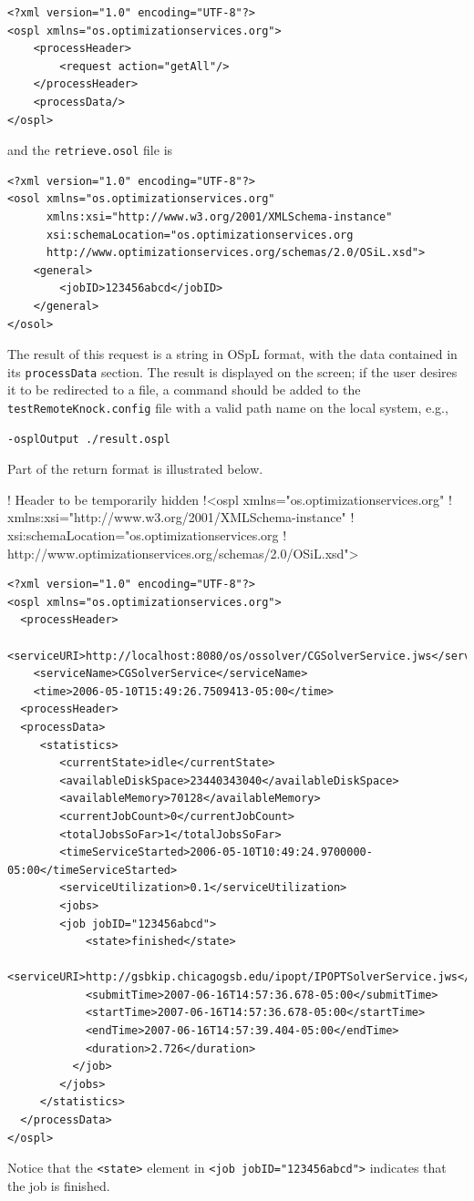 \documentclass[11pt]{article}
\renewcommand{\_}{{\char"5F}}
\renewcommand{\{}{{\char"7B}}
\renewcommand{\}}{{\char"7D}}
\renewcommand{\^}{{\char"0D}}
\renewcommand{\'}{{\char"0D}}
\begin{document}
\begin{enumerate}[Step 1:]
\begin{verbatim}
<?xml version="1.0" encoding="UTF-8"?>
<ospl xmlns="os.optimizationservices.org">
    <processHeader>
        <request action="getAll"/>
    </processHeader>
    <processData/>
</ospl>
\end{verbatim}
and the {\tt retrieve.osol} file is
\begin{verbatim}
<?xml version="1.0" encoding="UTF-8"?>
<osol xmlns="os.optimizationservices.org"
      xmlns:xsi="http://www.w3.org/2001/XMLSchema-instance"
      xsi:schemaLocation="os.optimizationservices.org
      http://www.optimizationservices.org/schemas/2.0/OSiL.xsd">
    <general>
        <jobID>123456abcd</jobID>
    </general>
</osol>
\end{verbatim}

The result of this request is a string in OSpL format, with the data contained in its
{\tt processData} section.  The result is displayed on the screen; if the user desires it
to be redirected to a file, a command should be added to the {\tt testRemoteKnock.config}
file with a valid path name on the local system, e.g.,

\begin{verbatim}
-osplOutput ./result.ospl
\end{verbatim}

Part of the return format is illustrated below.

! Header to be temporarily hidden
!<ospl xmlns="os.optimizationservices.org"
!      xmlns:xsi="http://www.w3.org/2001/XMLSchema-instance"
!      xsi:schemaLocation="os.optimizationservices.org
!      http://www.optimizationservices.org/schemas/2.0/OSiL.xsd">

\begin{verbatim}
<?xml version="1.0" encoding="UTF-8"?>
<ospl xmlns="os.optimizationservices.org">
  <processHeader>
    <serviceURI>http://localhost:8080/os/ossolver/CGSolverService.jws</serviceURI>
    <serviceName>CGSolverService</serviceName>
    <time>2006-05-10T15:49:26.7509413-05:00</time>
  <processHeader>
  <processData>
     <statistics>
        <currentState>idle</currentState>
        <availableDiskSpace>23440343040</availableDiskSpace>
        <availableMemory>70128</availableMemory>
        <currentJobCount>0</currentJobCount>
        <totalJobsSoFar>1</totalJobsSoFar>
        <timeServiceStarted>2006-05-10T10:49:24.9700000-05:00</timeServiceStarted>
        <serviceUtilization>0.1</serviceUtilization>
        <jobs>
        <job jobID="123456abcd">
            <state>finished</state>
            <serviceURI>http://gsbkip.chicagogsb.edu/ipopt/IPOPTSolverService.jws</serviceURI>
            <submitTime>2007-06-16T14:57:36.678-05:00</submitTime>
            <startTime>2007-06-16T14:57:36.678-05:00</startTime>
            <endTime>2007-06-16T14:57:39.404-05:00</endTime>
            <duration>2.726</duration>
          </job>
        </jobs>
     </statistics>
  </processData>
</ospl>
\end{verbatim}
Notice that the {\tt <state>} element in {\tt <job jobID="123456abcd">} indicates that the job is finished.


\end{enumerate}
\end{document}
